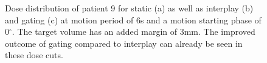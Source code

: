  \begin{figure}[H]
 \begin{center}
\caption{Dose distribution of patient 9 for static (a) as well as interplay (b) and gating (c) at motion period of 6s and a motion starting 
phase of 0$^{\circ}$. The target volume has an added margin of 3mm. The improved outcome of gating compared to interplay 
can already be seen in these dose cuts.}
\label{dose_pat122}
 \end{center}
\end{figure}

